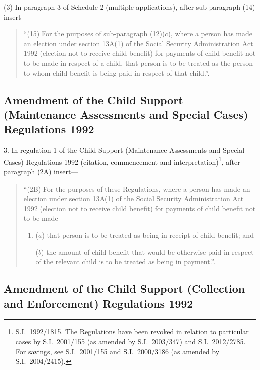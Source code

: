 \documentclass[12pt,a4paper]{article}
\begin{document}
(3) In paragraph 3 of Schedule 2 (multiple applications), after sub-paragraph (14) insert—
\begin{quotation}
“(15) For the purposes of sub-paragraph (12)($c$), where a person has made an election under section 13A(1) of the Social Security Administration Act 1992 (election not to receive child benefit) for payments of child benefit not to be made in respect of a child, that person is to be treated as the person to whom child benefit is being paid in respect of that child.”.
\end{quotation}

\subsection[3. Amendment of the Child Support (Maintenance Assessments and Special Cases) Regulations 1992]{Amendment of the Child Support (Maintenance Assessments and Special Cases) Regulations 1992}

3.  In regulation 1 of the Child Support (Maintenance Assessments and Special Cases) Regulations 1992 (citation, commencement and interpretation)\footnote{S.I.~1992/1815. The Regulations have been revoked in relation to particular cases by S.I.~2001/155 (as amended by S.I.~2003/347) and S.I.~2012/2785. For savings, see S.I.~2001/155 and S.I.~2000/3186 (as amended by S.I.~2004/2415).}, after paragraph (2A) insert—
\begin{quotation}
“(2B) For the purposes of these Regulations, where a person has made an election under section 13A(1) of the Social Security Administration Act 1992 (election not to receive child benefit) for payments of child benefit not to be made—
\begin{enumerate}\item[]
($a$) that person is to be treated as being in receipt of child benefit; and

($b$) the amount of child benefit that would be otherwise paid in respect of the relevant child is to be treated as being in payment.”.
\end{enumerate}
\end{quotation}

\subsection[4. Amendment of the Child Support (Collection and Enforcement) Regulations 1992]{Amendment of the Child Support (Collection and Enforcement) Regulations 1992}
\end{document}
